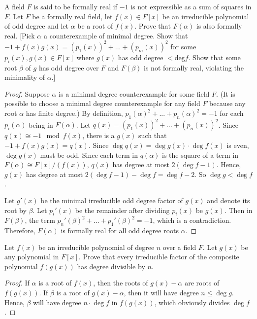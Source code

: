 \documentclass[10pt]{article}
\newenvironment{problem}[2][Problem]{\begin{trivlist}
		\item[\hskip \labelsep {\bfseries #1}\hskip \labelsep {\bfseries #2.}]}{\end{trivlist}}
\begin{document}
	\begin{problem}{1.15}
		A field $F$ is said to be formally real if $-1$ is not expressible as a sum of squares in $F$. Let $F$ be a formally real field, let $f(x)\in F[x]$ be an irreducible polynomial of odd degree and let $\alpha$ be a root of $f(x)$. Prove that $F(\alpha)$ is also formally real. [Pick $\alpha$ a counterexample of minimal degree. Show that $-1 + f(x)g(x) = (p_1(x))^2 + ... + (p_m(x))^2$ for some $p_i(x), g(x) \in F[x]$ where $g(x)$ has odd degree $<\text{deg} f$. Show that some root $\beta$ of $g$ has	odd degree over $F$ and $F(\beta)$ is not formally real, violating the minimality of $\alpha$.]
		\begin{proof}
			Suppose $\alpha$ is a minimal degree counterexample for some field $F$. (It is possible to choose a minimal degree counterexample for any field $F$ because any root $\alpha$ has finite degree.) By definition, $p_1(\alpha)^2 + ... + p_n(\alpha)^2 = -1$ for each $p_i(\alpha)$ being in $F(\alpha)$. Let $q(x) = (p_1(x))^{2} + ... + (p_n(x))^{2}$. Since $q(x) \cong -1 \mod f(x)$, there is a $g(x)$ such that $-1 + f(x)g(x) = q(x)$. Since $\deg q(x) = \deg g(x) \cdot \deg f(x)$ is even, $\deg g(x)$ must be odd. Since each term in $q(\alpha)$ is the square of a term in $F(\alpha) \cong F[x]/(f(x))$, $q(x)$ has degree at most $2(\deg f - 1)$. Hence, $g(x)$ has degree at most $2(\deg f -1) - \deg f = \deg f - 2$. So $\deg g < \deg f$.
			
			Let $g'(x)$ be the minimal irreducible odd degree factor of $g(x)$ and denote its root by $\beta$. Let $p_i'(x)$ be the remainder after dividing $p_i(x)$ be $g(x)$. Then in $F(\beta)$, the term $p_n'(\beta)^2 + ... + p_1'(\beta)^2 = -1$, which is a contradiction. Therefore, $F(\alpha)$ is formally real for all odd degree roots $\alpha$.
		\end{proof}
	\end{problem}
	
	\begin{problem}{2.17}
		Let $f(x)$ be an irreducible polynomial of degree $n$ over a field $F$. Let $g(x)$ be any polynomial in $F[x]$. Prove that every irreducible factor of the composite polynomial $f(g(x))$ has degree divisible by $n$.
		\begin{proof}
			If $\alpha$ is a root of $f(x)$, then the roots of $g(x) - \alpha$ are roots of $f(g(x))$. If $\beta$ is a root of $g(x) - \alpha$, then it will have degree $n \leq \deg g$. Hence, $\beta$ will have degree $n\cdot \deg f$ in $f(g(x))$, which obviously divides $\deg f$.
		\end{proof}
	\end{problem}
	
\end{document}
